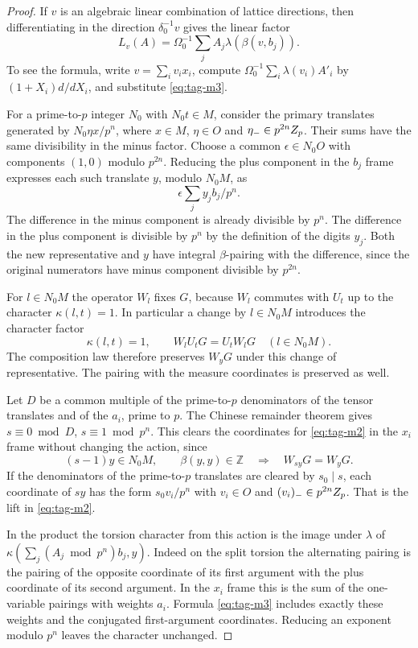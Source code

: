 \begin{proof}
If \(v\) is an algebraic linear combination
of lattice directions, then differentiating in
the direction \(\delta_0^{-1}v\) gives the linear
factor
\[
         L_v(A)=\Omega_0^{-1}\sum_j
               A_j\lambda(\beta(v,b_j)).
\tag{M4}\label{eq:tag-m4}
\]
To see the formula, write \(v=\sum_i v_i x_i\), compute
\(\Omega_0^{-1}\sum_i\lambda(v_i)A'_i\) by
\((1+X_i)d/dX_i\), and substitute \eqref{eq:tag-m3}.

For a prime-to-\(p\) integer \(N_0\) with
\(N_0t\in M\), consider the primary translates generated
by \(N_0\eta x/p^n\), where \(x\in M\), \(\eta\in O\)
and \(\eta_-\in p^{2n}Z_p\). Their sums have the same
divisibility in the minus factor. Choose a common
\(\epsilon\in N_0O\) with components \((1,0)\) modulo
\(p^{2n}\). Reducing the plus component in the \(b_j\)
frame expresses each such translate \(y\), modulo
\(N_0 M\), as 
\[
  \epsilon\sum_j y_j b_j/p^n.
\]
The difference in the minus component is already
divisible by \(p^n\). The difference in the plus
component is divisible by \(p^n\) by the definition
of the digits \(y_j\). Both the new representative
and \(y\) have integral \(\beta\)-pairing with the
difference, since the original numerators have
minus component divisible by \(p^{2n}\).

For \(l\in N_0 M\) the operator \(W_l\) fixes \(G\),
because \(W_l\) commutes with \(U_t\) up to the
character \(\kappa(l,t)=1\).
In particular a change by \(l\in N_0M\) introduces the character factor
\[
  \kappa(l,t)=1,\qquad W_l U_tG=U_tW_lG\quad(l\in N_0M).
\]
 The composition law
therefore preserves \(W_yG\) under this change of
representative. The pairing with the measure
coordinates is preserved as well.

Let \(D\) be a common multiple of the prime-to-\(p\) denominators
of the tensor translates and of the \(a_i\), prime to \(p\).
The Chinese remainder theorem gives \(s\equiv0\bmod D\),
\(s\equiv1\bmod p^n\). This clears the coordinates for \eqref{eq:tag-m2} in
the \(x_i\) frame without changing the action, since
\[
 (s-1)y\in N_0M,\qquad \beta(y,y)\in\mathbb Z
       \quad\Longrightarrow\quad W_{sy}G=W_yG .
\]
If the denominators of the prime-to-\(p\) translates
are cleared by \(s_0\mid s\), each coordinate of
\(s y\) has the form \(s_0 v_i/p^n\) with
\(v_i\in O\) and \((v_i)_-\in p^{2n}Z_p\).
That is the lift in \eqref{eq:tag-m2}.

In the product the
torsion character from this action is the image
under \(\lambda\) of
\(\kappa(\sum_j (A_j\bmod p^n)b_j,y)\).
Indeed on the split torsion the alternating pairing is
the pairing of the opposite coordinate of its first
argument with the plus coordinate of its second
argument. In the \(x_i\) frame this is the sum
of the one-variable pairings with weights \(a_i\).
Formula \eqref{eq:tag-m3} includes exactly these weights and the
conjugated first-argument coordinates. Reducing an
exponent modulo \(p^n\) leaves the character unchanged.


\end{proof}
